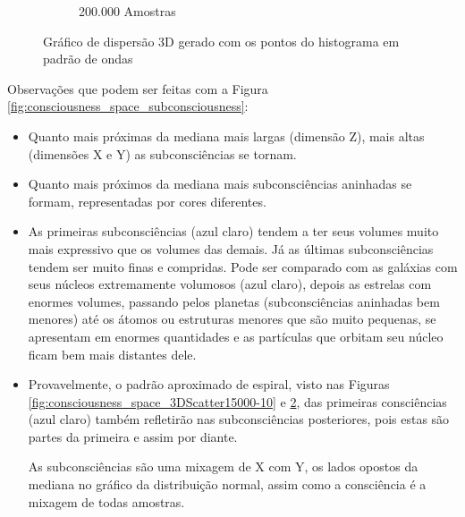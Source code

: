 \begin{figure}[H]
\begin{subfigure}[H]{0.47\linewidth}
	\caption{200.000 Amostras}
	\label{fig:consciousness_space_3DScatter_200000-2}
	\end{subfigure}%
\caption{Gráfico de dispersão 3D gerado com os pontos do histograma em padrão de ondas}
\end{figure}

Observações que podem ser feitas com a Figura \ref{fig:consciousness_space_subconsciousness}:
\begin{itemize}
  \item Quanto mais próximas da mediana mais largas (dimensão Z), mais altas (dimensões X e Y) as subconsciências se tornam.
  \item Quanto mais próximos da mediana mais subconsciências aninhadas se formam, representadas por cores diferentes. 
  \item As primeiras subconsciências (azul claro) tendem a ter seus volumes muito mais expressivo que os volumes das demais. Já as últimas subconsciências tendem ser muito finas e compridas. Pode ser comparado com as galáxias com seus núcleos extremamente volumosos (azul claro), depois as estrelas com enormes volumes, passando pelos planetas (subconsciências aninhadas bem menores) até os átomos ou estruturas menores que são muito pequenas, se apresentam em enormes quantidades e as partículas que orbitam seu núcleo ficam bem mais distantes dele.
  \item Provavelmente, o padrão aproximado de espiral, visto nas Figuras \ref{fig:consciousness_space_3DScatter15000-10} e \ref{fig:consciousness_space_3DScatter_200000-2}, das primeiras consciências (azul claro) também refletirão nas subconsciências posteriores, pois estas são partes da primeira e assim por diante.
  
 As subconsciências são uma mixagem de X com Y, os lados opostos da mediana no gráfico da distribuição normal, assim como a consciência é a mixagem de todas amostras.
\end{itemize}
